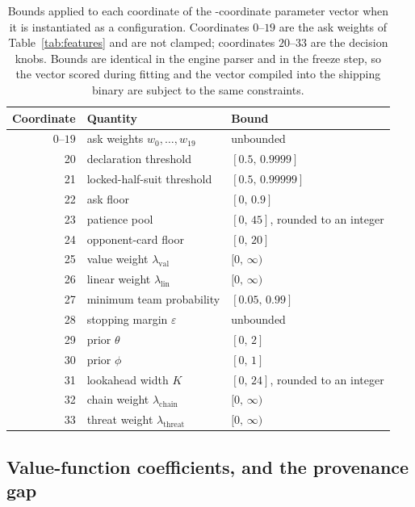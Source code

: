 \begin{table}[ht]
\centering
\caption{Bounds applied to each coordinate of the \numParams{}-coordinate
parameter vector when it is instantiated as a configuration. Coordinates
$0$--$19$ are the ask weights of Table~\ref{tab:features} and are not clamped;
coordinates $20$--$33$ are the decision knobs. Bounds are identical in the engine
parser and in the freeze step, so the vector scored during fitting and the vector
compiled into the shipping binary are subject to the same constraints.}
\label{tab:bounds}
\small
\begin{tabular}{rll}
\toprule
Coordinate & Quantity & Bound \\
\midrule
$0$--$19$ & ask weights $w_0,\dots,w_{19}$ & unbounded \\
20 & declaration threshold & $[0.5,\,0.9999]$ \\
21 & locked-half-suit threshold & $[0.5,\,0.99999]$ \\
22 & ask floor & $[0,\,0.9]$ \\
23 & patience pool & $[0,\,45]$, rounded to an integer \\
24 & opponent-card floor & $[0,\,20]$ \\
25 & value weight $\lambda_{\mathrm{val}}$ & $[0,\,\infty)$ \\
26 & linear weight $\lambda_{\mathrm{lin}}$ & $[0,\,\infty)$ \\
27 & minimum team probability & $[0.05,\,0.99]$ \\
28 & stopping margin $\varepsilon$ & unbounded \\
29 & prior $\theta$ & $[0,\,2]$ \\
30 & prior $\phi$ & $[0,\,1]$ \\
31 & lookahead width $K$ & $[0,\,24]$, rounded to an integer \\
32 & chain weight $\lambda_{\mathrm{chain}}$ & $[0,\,\infty)$ \\
33 & threat weight $\lambda_{\mathrm{threat}}$ & $[0,\,\infty)$ \\
\bottomrule
\end{tabular}
\end{table}

\subsection{Value-function coefficients, and the provenance gap}


